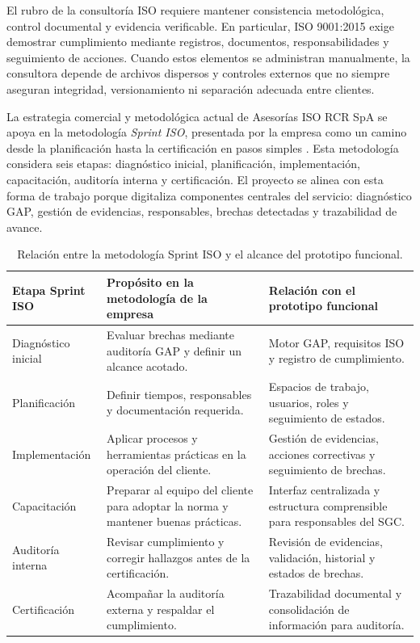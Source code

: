 \documentclass[final]{udpthesis}
\begin{document}
El rubro de la consultoría ISO requiere mantener consistencia metodológica, control documental y evidencia verificable. En particular, ISO 9001:2015 exige demostrar cumplimiento mediante registros, documentos, responsabilidades y seguimiento de acciones. Cuando estos elementos se administran manualmente, la consultora depende de archivos dispersos y controles externos que no siempre aseguran integridad, versionamiento ni separación adecuada entre clientes.

La estrategia comercial y metodológica actual de Asesorías ISO RCR SpA se apoya en la metodología \textit{Sprint ISO}, presentada por la empresa como un camino desde la planificación hasta la certificación en pasos simples \cite{entrevista-maria}. Esta metodología considera seis etapas: diagnóstico inicial, planificación, implementación, capacitación, auditoría interna y certificación. El proyecto se alinea con esta forma de trabajo porque digitaliza componentes centrales del servicio: diagnóstico GAP, gestión de evidencias, responsables, brechas detectadas y trazabilidad de avance.

\begin{table}[H]
\centering
\small
\begin{tabularx}{\textwidth}{|L{2.8cm}|Y|Y|}
\hline
{}\textbf{Etapa Sprint ISO} & \textbf{Propósito en la metodología de la empresa} & \textbf{Relación con el prototipo funcional} \\ \hline
Diagnóstico inicial & Evaluar brechas mediante auditoría GAP y definir un alcance acotado. & Motor GAP, requisitos ISO y registro de cumplimiento. \\ \hline
Planificación & Definir tiempos, responsables y documentación requerida. & Espacios de trabajo, usuarios, roles y seguimiento de estados. \\ \hline
Implementación & Aplicar procesos y herramientas prácticas en la operación del cliente. & Gestión de evidencias, acciones correctivas y seguimiento de brechas. \\ \hline
Capacitación & Preparar al equipo del cliente para adoptar la norma y mantener buenas prácticas. & Interfaz centralizada y estructura comprensible para responsables del SGC. \\ \hline
Auditoría interna & Revisar cumplimiento y corregir hallazgos antes de la certificación. & Revisión de evidencias, validación, historial y estados de brechas. \\ \hline
Certificación & Acompañar la auditoría externa y respaldar el cumplimiento. & Trazabilidad documental y consolidación de información para auditoría. \\ \hline
\end{tabularx}
\normalsize
\caption{Relación entre la metodología Sprint ISO y el alcance del prototipo funcional.}
\label{tab:sprint-iso-mvp}
\end{table}
\end{document}
